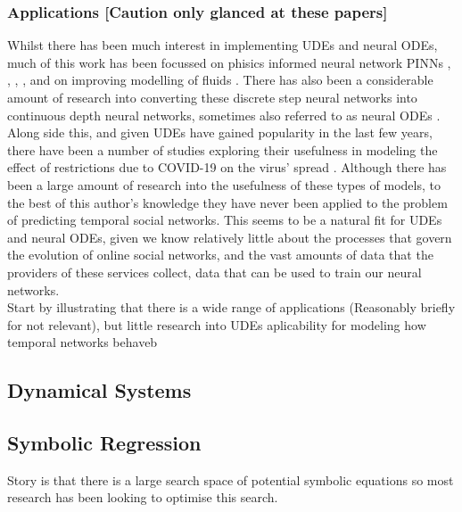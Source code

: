 \documentclass[12pt]{article}
\begin{document}
        \subsubsection{Applications [Caution only glanced at these papers]}
        Whilst there has been much interest in implementing UDEs and neural ODEs, much of this work has been focussed on phisics informed neural network PINNs \cite{karniadakis2021physics}, \cite{GAO2021110079}, \cite{krishnapriyan2021characterizing}, \cite{roehrl2020modeling}, and on improving modelling of fluids \cite{mahmoudabadbozchelou2021data} \cite{nguyen2022physics}. There has also been a considerable amount of research into converting these discrete step neural networks into continuous depth neural networks, sometimes also referred to as neural ODEs \cite{massaroli2020dissecting} \cite{poli2019graph} \cite{NEURIPS2020_c9f2f917}. Along side this, and given UDEs have gained popularity in the last few years, there have been a number of studies exploring their usefulness in modeling the effect of restrictions due to COVID-19 on the virus' spread \cite{Dandekar2020.04.03.20052084}. Although there has been a large amount of research into the usefulness of these types of models, to the best of this author's knowledge they have never been applied to the problem of predicting temporal social networks. This seems to be a natural fit for UDEs and neural ODEs, given we know relatively little about the processes that govern the evolution of online social networks, and the vast amounts of data that the providers of these services collect, data that can be used to train our neural networks.\\

            
            
        
         Start by illustrating that there is a wide range of applications (Reasonably briefly for not relevant), but little research into UDEs aplicability for modeling how temporal networks behaveb
    \subsection{Dynamical Systems}
    
    \subsection{Symbolic Regression}
        Story is that there is a large search space of potential symbolic equations so most research has been looking to optimise this search. 
\end{document}
